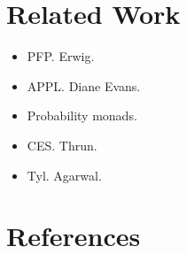 \documentclass{article}
\begin{document}
\section{Related Work}

\begin{itemize}
\item PFP. Erwig.
\item APPL. Diane Evans.
\item Probability monads.
\item CES. Thrun.
\item Tyl. Agarwal.
\end{itemize}


\section{References}
\end{document}
